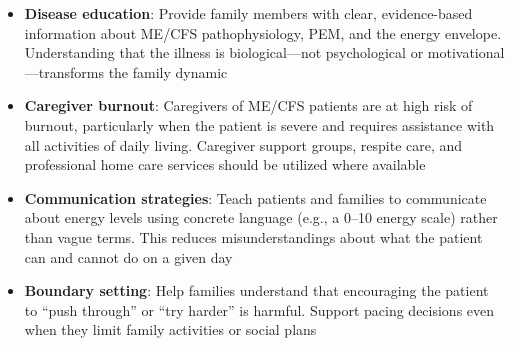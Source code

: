 \begin{itemize}
    \item \textbf{Disease education}: Provide family members with clear, evidence-based information about ME/CFS pathophysiology, PEM, and the energy envelope. Understanding that the illness is biological---not psychological or motivational---transforms the family dynamic
    \item \textbf{Caregiver burnout}: Caregivers of ME/CFS patients are at high risk of burnout, particularly when the patient is severe and requires assistance with all activities of daily living. Caregiver support groups, respite care, and professional home care services should be utilized where available
    \item \textbf{Communication strategies}: Teach patients and families to communicate about energy levels using concrete language (e.g., a 0--10 energy scale) rather than vague terms. This reduces misunderstandings about what the patient can and cannot do on a given day
    \item \textbf{Boundary setting}: Help families understand that encouraging the patient to ``push through'' or ``try harder'' is harmful. Support pacing decisions even when they limit family activities or social plans
\end{itemize}

